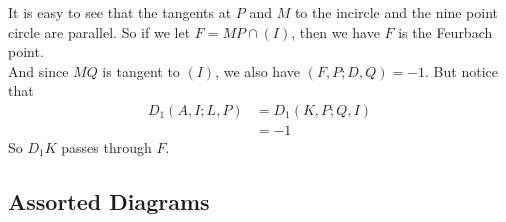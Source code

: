 
\begin{prooof}
    It is easy to see that the tangents at $P$ and $M$ to the incircle and the
    nine point circle are parallel. So if we let $F = MP\cap \left(I\right)$,
    then we have $F$ is the Feurbach point. \\

    And since $MQ$ is tangent to $(I)$, we also have $\left(F, P; D,
    Q\right)=-1$. But notice that
    \[\begin{aligned}
        D_1(A, I; L, P) &= D_1(K, P; Q, I)\\
                        &=-1
    \end{aligned}\]
    So $D_1K$ passes through $F$.
\end{prooof}



\newpage
\subsection{Assorted Diagrams}


